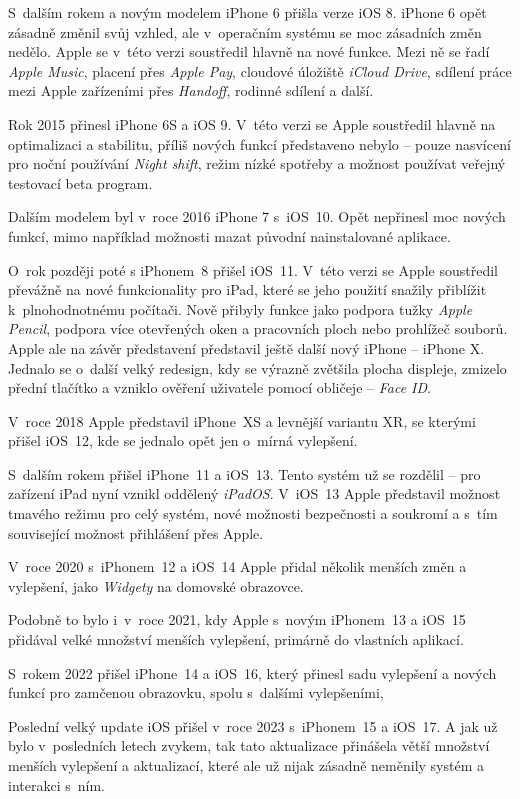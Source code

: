 S~dalším rokem a novým modelem iPhone 6 přišla verze iOS 8. iPhone 6 opět zásadně změnil svůj vzhled, ale v~operačním systému se moc zásadních změn nedělo. Apple se v~této verzi soustředil hlavně na nové funkce. Mezi ně se řadí \emph{Apple Music}, placení přes \emph{Apple Pay}, cloudové úložiště \emph{iCloud Drive}, sdílení práce mezi Apple zařízeními přes \emph{Handoff}, rodinné sdílení a další.

Rok 2015 přinesl iPhone 6S a iOS 9. V~této verzi se Apple soustředil hlavně na optimalizaci a stabilitu, příliš nových funkcí představeno nebylo – pouze nasvícení pro noční používání \emph{Night shift}, režim nízké spotřeby a možnost používat veřejný testovací beta program.

Dalším modelem byl v~roce 2016 iPhone 7 s~iOS~10. Opět nepřinesl moc nových funkcí, mimo například možnosti mazat původní nainstalované aplikace.

O~rok později poté s iPhonem~8 přišel iOS~11. V~této verzi se Apple soustředil převážně na nové funkcionality pro iPad, které se jeho použití snažily přiblížit k~plnohodnotnému počítači. Nově přibyly funkce jako podpora tužky \emph{Apple Pencil}, podpora více otevřených oken a pracovních ploch nebo prohlížeč souborů. Apple ale na závěr představení představil ještě další nový iPhone – iPhone X. Jednalo se o~další velký redesign, kdy se výrazně zvětšila plocha displeje, zmizelo přední tlačítko a vzniklo ověření uživatele pomocí obličeje – \emph{Face ID}.

V~roce 2018 Apple představil iPhone~XS a levnější variantu XR, se kterými přišel iOS~12, kde se jednalo opět jen o~mírná vylepšení. 

S~dalším rokem přišel iPhone~11 a iOS~13. Tento systém už se rozdělil – pro zařízení iPad nyní vznikl oddělený \emph{iPadOS}. V~iOS~13 Apple představil možnost tmavého režimu pro celý systém, nové možnosti bezpečnosti a soukromí a s~tím související možnost přihlášení přes Apple.

V~roce 2020 s~iPhonem~12 a iOS~14 Apple přidal několik menších změn a vylepšení, jako \emph{Widgety} na domovské obrazovce.

Podobně to bylo i~v~roce 2021, kdy Apple s~novým iPhonem~13 a iOS~15 přidával velké množství menších vylepšení, primárně do vlastních aplikací.

S~rokem 2022 přišel iPhone~14 a iOS~16, který přinesl sadu vylepšení a nových funkcí pro zamčenou obrazovku, spolu s~dalšími vylepšeními,

Poslední velký update iOS přišel v~roce 2023 s~iPhonem~15 a iOS~17. A jak už bylo v~posledních letech zvykem, tak tato aktualizace přinášela větší množství menších vylepšení a aktualizací, které ale už nijak zásadně neměnily systém a interakci s~ním. \cite{history-of-ios}

